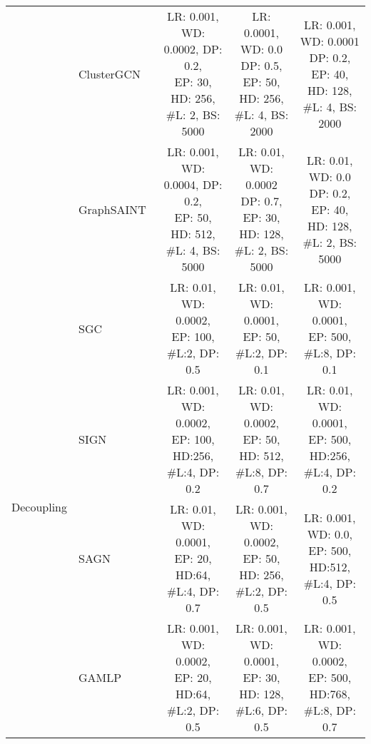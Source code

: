 \message{ !name(main.tex)}\documentclass{article}
\begin{document}
\begin{table}[!ht]
{\begin{tabular}{llccc}
			\cmidrule(lr){2-5}
			                            & ClusterGCN~\citep{chiang2019cluster}       & \makecell{LR: 0.001, WD: 0.0002, DP: 0.2,                             \\ EP: 30, HD: 256, \#L: 2, BS: 5000} & \makecell{LR: 0.0001, WD: 0.0 DP: 0.5, \\ EP: 50, HD: 256, \#L: 4, BS: 2000} & \makecell{LR: 0.001, WD: 0.0001 DP: 0.2, \\ EP: 40, HD: 128, \#L: 4, BS: 2000}      \\
			\cmidrule(lr){2-5}
			                            & GraphSAINT~\citep{zeng2019graphsaint}      & \makecell{LR: 0.001, WD: 0.0004, DP: 0.2,                             \\ EP: 50, HD: 512, \#L: 4, BS: 5000} & \makecell{LR: 0.01, WD: 0.0002 DP: 0.7, \\ EP: 30, HD: 128, \#L: 2, BS: 5000} & \makecell{LR: 0.01, WD: 0.0 DP: 0.2, \\ EP: 40, HD: 128, \#L: 2, BS: 5000}      \\
			\midrule
			\multirow{8}{*}{Decoupling} & SGC~\citep{wu2019simplifying}              & \makecell{LR: 0.01, WD: 0.0002,                                       \\ EP: 100, \#L:2, DP: 0.5} & \makecell{LR: 0.01, WD: 0.0001, \\ EP: 50, \#L:2, DP: 0.1} & \makecell{LR: 0.001, WD: 0.0001, \\ EP: 500, \#L:8, DP: 0.1} \\
			\cmidrule(lr){2-5}
			                            & SIGN~\citep{frasca2020sign}                & \makecell{LR: 0.001, WD: 0.0002,                                      \\ EP: 100, HD:256, \#L:4, DP: 0.2} & \makecell{LR: 0.01, WD: 0.0002, \\ EP: 50, HD: 512, \#L:8, DP: 0.7} & \makecell{LR: 0.01, WD: 0.0001, \\ EP: 500, HD:256, \#L:4, DP: 0.2} \\
			\cmidrule(lr){2-5}
			                            & SAGN~\citep{sun2021scalable}               & \makecell{LR: 0.01, WD: 0.0001,                                       \\ EP: 20, HD:64, \#L:4, DP: 0.7} & \makecell{LR: 0.001, WD: 0.0002, \\ EP: 50, HD: 256, \#L:2, DP: 0.5} & \makecell{LR: 0.001, WD: 0.0, \\ EP: 500, HD:512, \#L:4, DP: 0.5} \\
			\cmidrule(lr){2-5}
			                            & GAMLP~\citep{zhang2021graph}               & \makecell{LR: 0.001, WD: 0.0002,                                      \\ EP: 20, HD:64, \#L:2, DP: 0.5} & \makecell{LR: 0.001, WD: 0.0001, \\ EP: 30, HD: 128, \#L:6, DP: 0.5} & \makecell{LR: 0.001, WD: 0.0002, \\ EP: 500, HD:768, \#L:8, DP: 0.7} \\

\end{tabular}}
\end{table}
\end{document}
